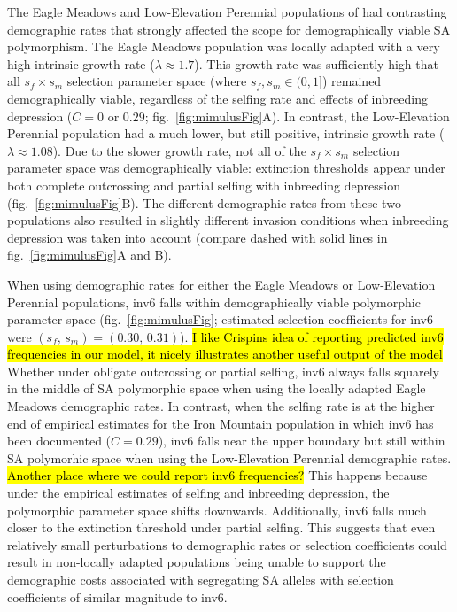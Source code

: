 \documentclass[11pt,draft]{article}
\begin{document}
The Eagle Meadows and Low-Elevation Perennial populations of \citet{PetersonEtAl2016} had contrasting demographic rates that strongly affected the scope for demographically viable SA polymorphism. The Eagle Meadows population was locally adapted with a very high intrinsic growth rate ($\lambda \approx 1.7$). This growth rate was sufficiently high that all $s_f \times s_m$ selection parameter space (where $s_f, s_m \in (0,1]$) remained demographically viable, regardless of the selfing rate and effects of inbreeding depression ($C = 0$ or $0.29$; fig.~\ref{fig:mimulusFig}A). In contrast, the Low-Elevation Perennial population had a much lower, but still positive, intrinsic growth rate ($\lambda \approx 1.08$). Due to the slower growth rate, not all of the $s_f \times s_m$ selection parameter space was demographically viable: extinction thresholds appear under both complete outcrossing and partial selfing with inbreeding depression (fig.~\ref{fig:mimulusFig}B). The different demographic rates from these two populations also resulted in slightly different invasion conditions when inbreeding depression was taken into account (compare dashed with solid lines in fig.~\ref{fig:mimulusFig}A and B).

When using demographic rates for either the Eagle Meadows or Low-Elevation Perennial populations, inv6 falls within demographically viable polymorphic parameter space (fig.~\ref{fig:mimulusFig}; estimated selection coefficients for inv6 were $(s_f,\,s_m) = (0.30,\, 0.31)$). \hl{I like Crispins idea of reporting predicted inv6 frequencies in our model, it nicely illustrates another useful output of the model} Whether under obligate outcrossing or partial selfing, inv6 always falls squarely in the middle of SA polymorphic space when using the locally adapted Eagle Meadows demographic rates. In contrast, when the selfing rate is at the higher end of empirical estimates for the Iron Mountain population in which inv6 has been documented ($C = 0.29$), inv6 falls near the upper boundary but still within SA polymorhic space when using the Low-Elevation Perennial demographic rates. \hl{Another place where we could report inv6 frequencies?} This happens because under the empirical estimates of selfing and inbreeding depression, the polymorphic parameter space shifts downwards. Additionally, inv6 falls much closer to the extinction threshold under partial selfing. This suggests that even relatively small perturbations to demographic rates or selection coefficients could result in non-locally adapted populations being unable to support the demographic costs associated with segregating SA alleles with selection coefficients of similar magnitude to inv6. 
\end{document}
